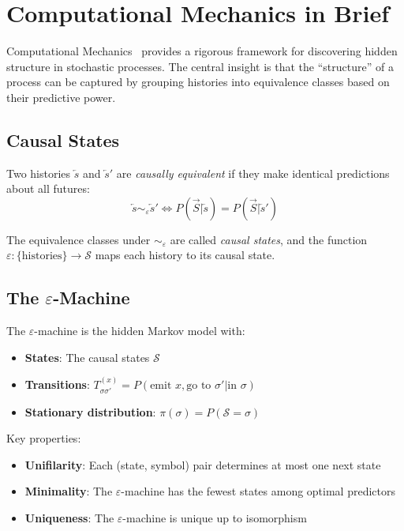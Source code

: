 \documentclass[11pt,a4paper]{report}
\theoremstyle{definition}
\theoremstyle{plain}
\newcommand{\eps}{\varepsilon}
\newcommand{\calS}{\mathcal{S}}
\begin{document}
\section{Computational Mechanics in Brief}

Computational Mechanics~\cite{crutchfield1989inferring,shalizi2001computational} provides a rigorous framework for discovering hidden structure in stochastic processes. The central insight is that the ``structure'' of a process can be captured by grouping histories into equivalence classes based on their predictive power.

\subsection{Causal States}

Two histories $\overleftarrow{s}$ and $\overleftarrow{s}'$ are \emph{causally equivalent} if they make identical predictions about all futures:
\begin{equation}
    \overleftarrow{s} \sim_\varepsilon \overleftarrow{s}' \iff P(\overrightarrow{S} | \overleftarrow{s}) = P(\overrightarrow{S} | \overleftarrow{s}')
\end{equation}

The equivalence classes under $\sim_\varepsilon$ are called \emph{causal states}, and the function $\varepsilon: \{\text{histories}\} \to \calS$ maps each history to its causal state.

\subsection{The $\eps$-Machine}

The $\eps$-machine is the hidden Markov model with:
\begin{itemize}
    \item \textbf{States}: The causal states $\calS$
    \item \textbf{Transitions}: $T^{(x)}_{\sigma\sigma'} = P(\text{emit } x, \text{go to } \sigma' | \text{in } \sigma)$
    \item \textbf{Stationary distribution}: $\pi(\sigma) = P(\calS = \sigma)$
\end{itemize}

Key properties:
\begin{itemize}
    \item \textbf{Unifilarity}: Each (state, symbol) pair determines at most one next state
    \item \textbf{Minimality}: The $\eps$-machine has the fewest states among optimal predictors
    \item \textbf{Uniqueness}: The $\eps$-machine is unique up to isomorphism
\end{itemize}
\end{document}

